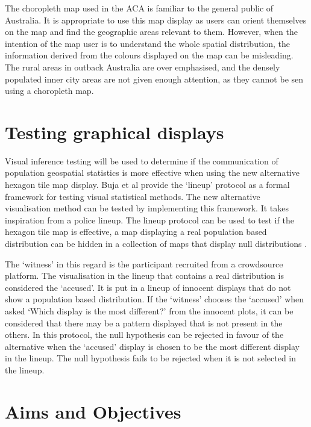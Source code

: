 \documentclass{monashthesis}
\begin{document}
The choropleth map used in the ACA is familiar to the general public of Australia. It is appropriate to use this map display as users can orient themselves on the map and find the geographic areas relevant to them.
However, when the intention of the map user is to understand the whole spatial distribution, the information derived from the colours displayed on the map can be misleading.
The rural areas in outback Australia are over emphasised, and the densely populated inner city areas are not given enough attention, as they cannot be sen using a choropleth map.

\hypertarget{testing-graphical-displays}{%
\section{Testing graphical displays}\label{testing-graphical-displays}}

Visual inference testing will be used to determine if the communication of population geospatial statistics is more effective when using the new alternative hexagon tile map display.
Buja et al \autocite{GIIV} provide the `lineup' protocol as a formal framework for testing visual statistical methods. The new alternative visualisation method can be tested by implementing this framework.
It takes inspiration from a police lineup.
The lineup protocol can be used to test if the hexagon tile map is effective, a map displaying a real population based distribution can be hidden in a collection of maps that display null distributions \autocite{chowd}.

The `witness' in this regard is the participant recruited from a crowdsource platform.
The visualisation in the lineup that contains a real distribution is considered the `accused'.
It is put in a lineup of innocent displays that do not show a population based distribution.
If the `witness' chooses the `accused' when asked `Which display is the most different?' from the innocent plots, it can be considered that there may be a pattern displayed that is not present in the others.
In this protocol, the null hypothesis can be rejected in favour of the alternative when the `accused' display is chosen to be the most different display in the lineup. The null hypothesis fails to be rejected when it is not selected in the lineup.

\hypertarget{sec:aims}{%
\section{Aims and Objectives}\label{sec:aims}}
\end{document}
